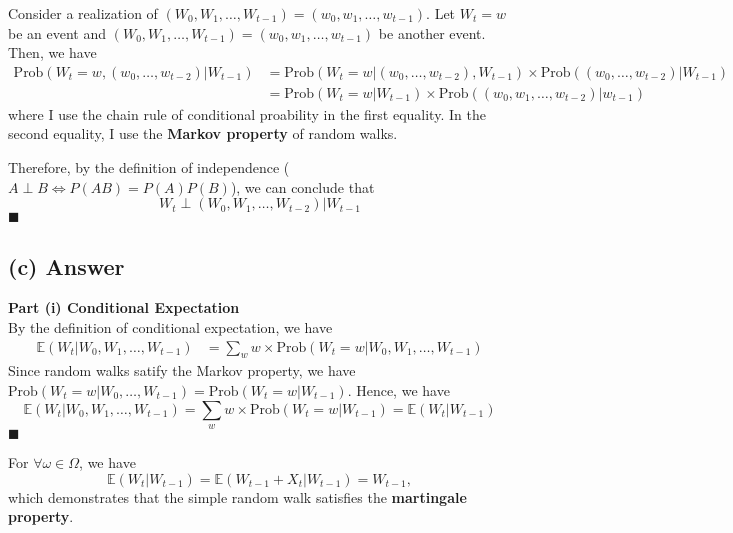 \documentclass[11pt]{article}
\theoremstyle{definition}
\theoremstyle{boldtitle} %
\numberwithin{equation}{section}
\numberwithin{figure}{section}
\numberwithin{table}{section}
\begin{document}
Consider a realization of $(W_0, W_1, \dots, W_{t-1}) = (w_0, w_1, \dots, w_{t-1})$.
Let $W_t = w$ be an event and $(W_0, W_1, \dots, W_{t-1}) = (w_0, w_1, \dots, w_{t-1})$ be another event.
Then, we have
\begin{equation}
  \label{eqn1:random_walk_independence}
  \begin{aligned}
  \text{Prob}(W_t = w , (w_0, \dots, w_{t-2}) |W_{t-1}) & = \text{Prob}(W_t = w | (w_0, \dots, w_{t-2}), W_{t-1}) \times \text{Prob}((w_0, \dots, w_{t-2}) | W_{t-1}) \\
    & = \text{Prob}(W_t = w | W_{t-1}) \times \text{Prob}((w_0, w_1, \dots, w_{t-2}) | w_{t-1})
  \end{aligned}
\end{equation}
where I use the chain rule of conditional proability in the first equality.
In the second equality, I use the \textbf{Markov property} of random walks.

Therefore, by the definition of independence ($A \perp B \Leftrightarrow P(AB) = P(A) P(B)$),
we can conclude that 
\[
W_t \perp (W_0, W_1, \dots, W_{t-2}) | W_{t-1}
\]
\(\blacksquare\)


\subsection{(c) Answer}
\noindent \textbf{Part (i) Conditional Expectation} 
\\
\noindent By the definition of conditional expectation, we have
\begin{align*}
  \mathbb{E}(W_t | W_0, W_1, \dots, W_{t-1}) & = \sum_{w} w \times \text{Prob}(W_t = w | W_0, W_1, \dots, W_{t-1}) 
\end{align*}
Since random walks satify the Markov property, we have $\text{Prob}(W_t = w | W_0, \dots, W_{t-1}) = \text{Prob}(W_t = w |  W_{t-1})$.
Hence, we have 
\[
  \mathbb{E}(W_t | W_0, W_1, \dots, W_{t-1}) = \sum_{w} w \times \text{Prob}(W_t = w | W_{t-1})  = \mathbb{E}(W_t | W_{t-1})
\]
\(\blacksquare\)

\vspace{5mm}
For $\forall \omega \in \Omega$, we have
\[
\mathbb{E}(W_t | W_{t-1}) = \mathbb{E}(W_{t-1} + X_t | W_{t-1}) = W_{t-1},
\]
which demonstrates that the simple random walk satisfies the \textbf{martingale property}.
\end{document}
